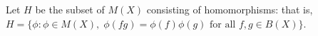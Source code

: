 Let $H$ be the subset of $M(X)$ consisting of homomorphisms: that is, $H = \{\phi : \phi \in M(X),\; \phi(fg) = \phi(f)\phi(g) \text{ for all } f, g \in B(X)\}$.
